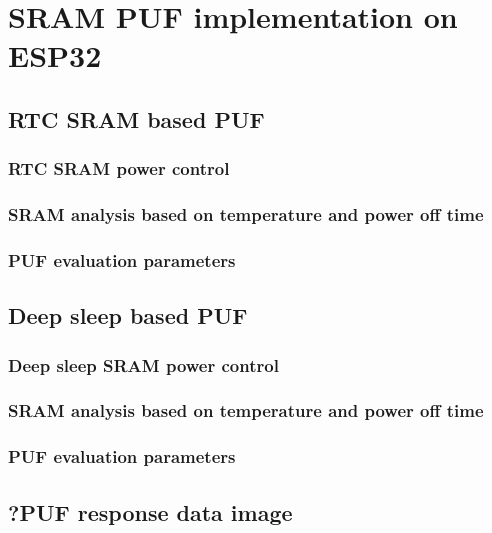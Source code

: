 \chapter{SRAM PUF implementation on ESP32}\label{sec:implementation}


\section{RTC SRAM based PUF}

\subsection{RTC SRAM power control}
\subsection{SRAM analysis based on temperature and power off time}
\subsection{PUF evaluation parameters}\label{sec:rtc_evaluation}

\section{Deep sleep based PUF}

\subsection{Deep sleep SRAM power control}
\subsection{SRAM analysis based on temperature and power off time}
\subsection{PUF evaluation parameters}\label{sec:deepsleep_evaluation}

\section{?PUF response data image} %

